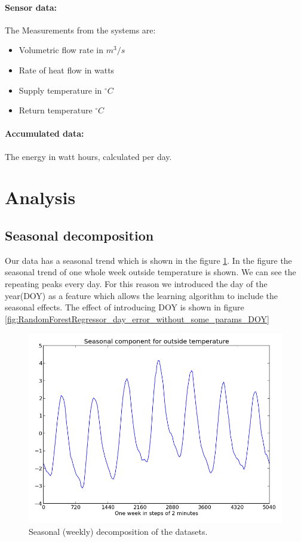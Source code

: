 \documentclass{scrartcl}
\begin{document}
\paragraph{Sensor data:}
The Measurements from the systems are:

\begin{itemize}
\item Volumetric flow rate in $m^3 / s$
\item Rate of heat flow in watts
\item Supply temperature in $^\circ C$
\item Return temperature $^\circ C$
\end{itemize}

\paragraph{Accumulated data:}
The energy in watt hours, calculated per day.

\section{Analysis}
\label{sec:analysis}
\subsection{Seasonal decomposition}
Our data has a seasonal trend which is shown in the figure \ref{fig:season_outside_temperature}. In the figure the seasonal trend of one whole week outside temperature is shown. We can see the repeating peaks every day. For this reason we introduced the day of the year(DOY) as a feature which allows the learning algorithm to include the seasonal effects. The effect of introducing DOY is shown in figure \ref{fig:RandomForestRegressor_day_error_without_some_params_DOY}

\begin{figure}[H]
  \center
  \includegraphics[width=0.6\linewidth]{img/season-outside_temperature.png}
  \caption{Seasonal (weekly) decomposition of the datasets.}
  \label{fig:season_outside_temperature}
\end{figure}
\end{document}

